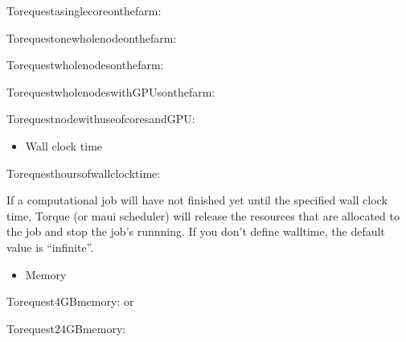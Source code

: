 \documentclass[a4paper,11pt,english]{sphinxmanual}
\begin{document}
\begin{sphinxVerbatim}[commandchars=\\\{\}]
Torequestasinglecoreonthefarm:

Torequestonewholenodeonthefarm:

Torequestwholenodesonthefarm:

TorequestwholenodeswithGPUsonthefarm:

TorequestnodewithuseofcoresandGPU:
\end{sphinxVerbatim}
\begin{itemize}
\item {} 
\sphinxAtStartPar
Wall clock time

\end{itemize}

\begin{sphinxVerbatim}[commandchars=\\\{\}]
Torequesthoursofwallclocktime:
\end{sphinxVerbatim}

\sphinxAtStartPar
If a computational job will have not finished yet until the specified wall clock time, Torque (or maui scheduler) will release the resources that are allocated to the job and stop the job’s runnning.
If you don’t define walltime, the default value is “infinite”.
\begin{itemize}
\item {} 
\sphinxAtStartPar
Memory

\end{itemize}

\begin{sphinxVerbatim}[commandchars=\\\{\}]
Torequest4GBmemory:
or

Torequest24GBmemory:
\end{sphinxVerbatim}
\end{document}
